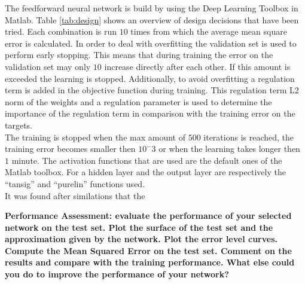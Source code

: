 \documentclass[a4paper,10pt]{article}
\begin{document}
The feedforward neural network is build by using the Deep Learning Toolbox in Matlab. Table \ref{tab:design} shows an overview of design decisions that have been tried. Each combination is run $ 10 $ times from which the average mean square error is calculated. In order to deal with overfitting the validation set is used to perform early stopping. This means that during training the error on the validation set may only $ 10 $ increase directly after each other. If this amount is exceeded the learning is stopped. Additionally, to avoid overfitting a regulation term is added in the objective function during training. This regulation term L2 norm of the weights and a regulation parameter is used to determine the importance of the regulation term in comparison with the training error on the targets.\\ The training is stopped when the max amount of $ 500 $ iterations is reached, the training error becomes smaller then $ 10^-3 $ or when the learning takes longer then $ 1 $ minute. The activation functions that are used are the default ones of the Matlab toolbox. For a hidden layer and the output layer are respectively the ``tansig'' and ``purelin'' functions used.\\
It was found after similations that the  











\textbf{Performance Assessment: evaluate the performance of your selected network on the test set. Plot the surface of
	the test set and the approximation given by the network. Plot the error level curves. Compute the Mean Squared
	Error on the test set. Comment on the results and compare with the training performance. What else could you
	do to improve the performance of your network?}\\
\end{document}
